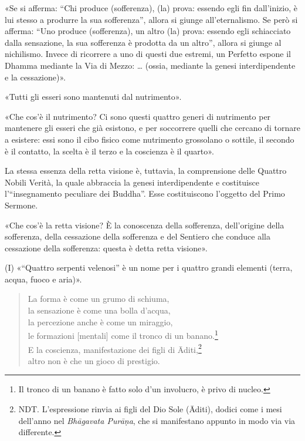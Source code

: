 
«Se si afferma: “Chi produce (sofferenza), (la) prova: essendo egli fin
dall’inizio, è lui stesso a produrre la sua sofferenza”, allora si giunge
all’eternalismo. Se però si afferma: “Uno produce (sofferenza), un altro (la)
prova: essendo egli schiacciato dalla sensazione, la sua sofferenza è prodotta
da un altro”, allora si giunge al nichilismo. Invece di ricorrere a uno di
questi due estremi, un Perfetto espone il Dhamma mediante la Via di Mezzo: …
(ossia, mediante la genesi interdipendente e la cessazione)».


«Tutti gli esseri sono mantenuti dal nutrimento».


«Che cos’è il nutrimento? Ci sono questi quattro generi di nutrimento per
mantenere gli esseri che già esistono, e per soccorrere quelli che cercano di
tornare a esistere: essi sono il cibo fisico come nutrimento grossolano o
sottile, il secondo è il contatto, la scelta è il terzo e la coscienza è il
quarto».


 La stessa essenza della retta visione è, tuttavia,
la comprensione delle Quattro Nobili Verità, la quale abbraccia la genesi
interdipendente e costituisce l’“insegnamento peculiare dei Buddha”. Esse
costituiscono l’oggetto del Primo Sermone.

 «Che cos’è la retta visione? È la conoscenza della
sofferenza, dell’origine della sofferenza, della cessazione della sofferenza e
del Sentiero che conduce alla cessazione della sofferenza: questa è detta retta
visione».


(I) «“Quattro serpenti velenosi” è un nome per i quattro grandi elementi (terra,
acqua, fuoco e aria)».


\begin{quote}
La forma è come un grumo di schiuma, \\
la sensazione è come una bolla d’acqua, \\
la percezione anche è come un miraggio, \\
le formazioni [mentali] come il tronco di un banano.\footnote{Il tronco di un banano è fatto solo d’un involucro, è privo di nucleo.} \\
E la coscienza, manifestazione dei figli di Āditi,\footnote{NDT. L’espressione rinvia ai figli del Dio Sole (Āditi), dodici come i mesi dell’anno nel \emph{Bhāgavata Purāṇa}, che si manifestano appunto in modo via via differente.} \\
altro non è che un gioco di prestigio.
\end{quote}

